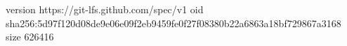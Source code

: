 version https://git-lfs.github.com/spec/v1
oid sha256:5d97f120d08de9e06e09f2eb9459fe0f27f08380b22a6863a18bf729867a3168
size 626416
